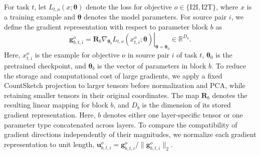 For task $t$, let $L_{t,o}(x;\boldsymbol{\theta})$ denote the loss
for objective $o\in\{\mathrm{I2I},\mathrm{I2T}\}$, where $x$ is a
training example and $\boldsymbol{\theta}$ denotes the model parameters.
For source pair $i$, we define the gradient representation with respect
to parameter block $b$ as
\[
\mathbf{g}^{o}_{b,t,i}
=
\mathbf{R}_b
\left.
\nabla_{\boldsymbol{\theta}_b}
L_{t,o}(x^{o}_{t,i};\boldsymbol{\theta})
\right|_{\boldsymbol{\theta}=\boldsymbol{\theta}_0}
\in\mathbb{R}^{D_b}.
\]
Here, $x^{o}_{t,i}$ is the example for objective $o$ in source pair $i$ of task $t$, $\boldsymbol{\theta}_0$ is the pretrained checkpoint, and $\boldsymbol{\theta}_b$ is the vector of parameters in block $b$. To reduce the storage and computational cost of large gradients,
we apply a fixed CountSketch projection to larger tensors before normalization and PCA, while retaining smaller tensors in their original coordinates. The map $\mathbf{R}_b$ denotes the resulting linear mapping for block $b$, and $D_b$ is the dimension of its stored gradient representation. Here, $b$ denotes either one layer-specific tensor or one parameter type concatenated across layers. 
To compare the compatibility of gradient directions independently
of their magnitudes, we normalize each gradient representation to unit
length,
$\mathbf{u}^{o}_{b,t,i}
=\mathbf{g}^{o}_{b,t,i}/\lVert\mathbf{g}^{o}_{b,t,i}\rVert_2$.




